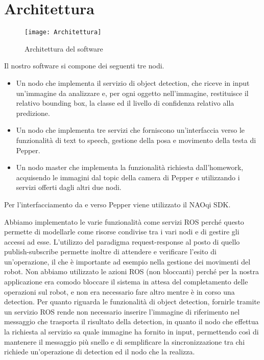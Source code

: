 \section{Architettura}

\begin{figure}[t]
	\centering
	\texttt{[image: Architettura]}
	\caption{Architettura del software}
	\label{fig:architecture}
\end{figure}

Il nostro software si compone dei seguenti tre nodi.
\begin{itemize}
    \item Un nodo che implementa il servizio di object detection, che riceve in input un’immagine da analizzare e, per ogni oggetto nell’immagine, restituisce il relativo bounding box, la classe ed il livello di confidenza relativo alla predizione.
    \item Un nodo che implementa tre servizi che forniscono un’interfaccia verso le funzionalità di text to speech, gestione della posa e movimento della testa di Pepper.
    \item Un nodo master che implementa la funzionalità richiesta dall’homework, acquisendo le immagini dal topic della camera di Pepper e utilizzando i servizi offerti dagli altri due nodi.
\end{itemize}
Per l’interfacciamento da e verso Pepper viene utilizzato il NAOqi SDK.

Abbiamo implementato le varie funzionalità come servizi ROS perché questo permette di modellarle come risorse condivise tra i vari nodi e di gestire gli accessi ad esse. L'utilizzo del paradigma request-response al posto di quello publish-subscribe permette inoltre di attendere e verificare l'esito di un'operazione, il che è importante ad esempio nella gestione dei movimenti del robot.
Non abbiamo utilizzato le azioni ROS (non bloccanti) perché per la nostra applicazione era comodo bloccare il sistema in attesa del completamento delle operazioni sul robot, e non era necessario fare altro mentre è in corso una detection.
Per quanto riguarda le funzionalità di object detection, fornirle tramite un servizio ROS rende non necessario inserire l'immagine di riferimento nel messaggio che trasporta il risultato della detection, in quanto il nodo che effettua la richiesta al servizio sa quale immagine ha fornito in input, permettendo così di mantenere il messaggio più snello e di semplificare la sincronizzazione tra chi richiede un'operazione di detection ed il nodo che la realizza.

